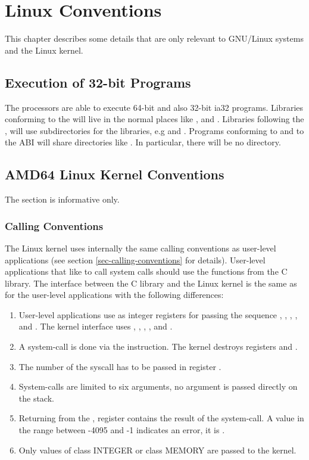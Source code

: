 \chapter{Linux Conventions}

This chapter describes some details that are only relevant to 
GNU/Linux systems and the Linux kernel.

\section{Execution of 32-bit Programs}


The \xARCH processors are able to execute 64-bit \xARCH and also
32-bit ia32 programs.  Libraries conforming to the \intelabi will live
in the normal places like ,  and
.  Libraries following the \xARCH, will use
 subdirectories for the libraries, e.g  and
.  Programs conforming to \intelabi and to the \xARCH
ABI will share directories like .  In particular, there
will be no  directory.

\section{AMD64 Linux Kernel Conventions}

The section is informative only.

\subsection{Calling Conventions}

The Linux \xARCH kernel uses internally the same calling conventions as user-level
applications (see section \ref{sec-calling-conventions} for details).
User-level applications that like to call system calls should use the
functions from the C library.  The interface between the C library and
the Linux kernel is the same as for the user-level applications with
the following differences:
\begin{enumerate}
\item User-level applications use as integer registers for passing the
  sequence \RDI, \RSI, \RDX, \RCX,  and .  The kernel
  interface uses \RDI, \RSI, \RDX, ,  and .
\item A system-call is done via the  instruction.  The
  kernel destroys registers \RCX and .
\item The number of the syscall has to be passed in register \RAX.
\item System-calls are limited to six arguments, no argument is passed
  directly on the stack.
\item Returning from the , register \RAX contains the
  result of the system-call.  A value in the range between -4095 and
  -1 indicates an error, it is .
\item Only values of class INTEGER or class MEMORY are passed to the
  kernel.
\end{enumerate}

